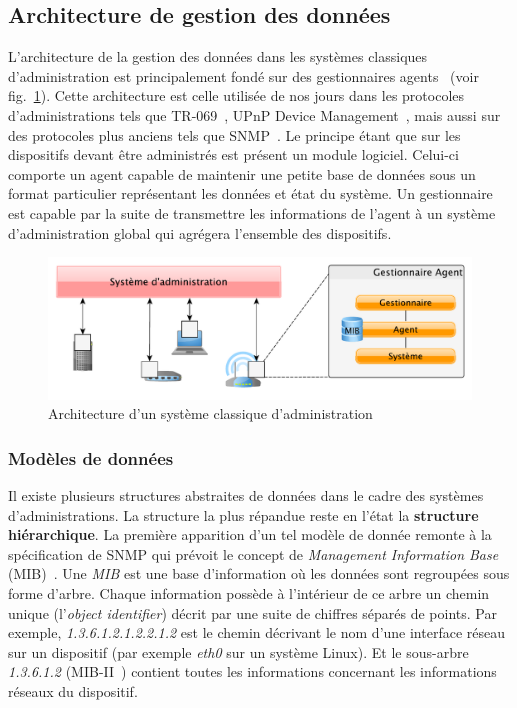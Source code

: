 \subsection{Architecture de gestion des données}
L'architecture de la gestion des données dans les systèmes classiques d'administration est principalement fondé sur des gestionnaires agents~\cite{CCITT:X700} (voir fig.~\ref{fig:rw:supervision:administration}). Cette architecture est celle utilisée de nos jours dans les protocoles d'administrations tels que TR-069~\cite{BBF:tr069}, UPnP Device Management~\cite{UPnP:MD}, mais aussi sur des protocoles plus anciens tels que SNMP~\cite{IETF:SNMP}. Le principe étant que sur les dispositifs devant être administrés est présent un module logiciel. Celui-ci comporte un agent capable de maintenir une petite base de données sous un format particulier représentant les données et état du système. Un gestionnaire est capable par la suite de transmettre les informations de l'agent à un système d'administration global qui agrégera l'ensemble des dispositifs.
\begin{figure}[ht]
    \centering
    \includegraphics[width=.75\textwidth]{fig/rw-supervision-administration}
    \caption{Architecture d'un système classique d'administration}\label{fig:rw:supervision:administration}
\end{figure}

\subsubsection{Modèles de données}
Il existe plusieurs structures abstraites de données dans le cadre des systèmes d'administrations. La structure la plus répandue reste en l'état la \textbf{structure hiérarchique}. La première apparition d'un tel modèle de donnée remonte à la spécification de SNMP qui prévoit le concept de \textit{Management Information Base} (MIB)~\cite{IETF:MIB}. Une \textit{MIB} est une base d'information où les données sont regroupées sous forme d'arbre. Chaque information possède à l'intérieur de ce arbre un chemin unique (l'\textit{object identifier}) décrit par une suite de chiffres séparés de points. Par exemple, \textit{1.3.6.1.2.1.2.2.1.2} est le chemin décrivant le nom d'une interface réseau sur un dispositif (par exemple \textit{eth0} sur un système Linux). Et le sous-arbre \textit{1.3.6.1.2} (MIB-II~\cite{IETF:MIB-II}) contient toutes les informations concernant les informations réseaux du dispositif.

